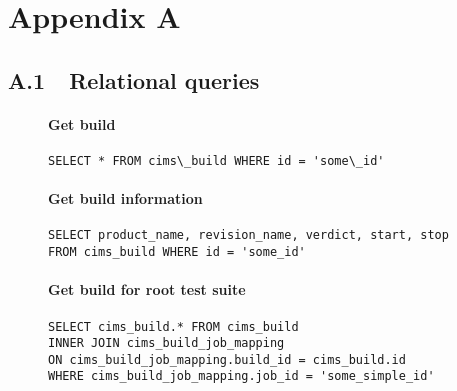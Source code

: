 \appendix
\chapter*{Appendix A}
\label{appendix1}
\section*{A.1\ \ Relational queries}
\label{relationalqueries}

\begin{figure}[H]
\subsubsection*{Get build}
\begin{mdframed}
\label{q:getbuild}
\begin{verbatim}
SELECT * FROM cims\_build WHERE id = 'some\_id'
\end{verbatim}
\label{code:get_build}
\end{mdframed}
\end{figure}

\begin{figure}[H]
\subsubsection*{Get build information}
\begin{mdframed}
\label{q:getbuild}
\begin{verbatim}
SELECT product_name, revision_name, verdict, start, stop
FROM cims_build WHERE id = 'some_id'
\end{verbatim}
\label{code:get_buildinfo}
\end{mdframed}
\end{figure}

\begin{figure}[H]
\subsubsection*{Get build for root test suite}
\label{q:getbuildforroot}
\begin{mdframed}
\begin{verbatim}
SELECT cims_build.* FROM cims_build
INNER JOIN cims_build_job_mapping
ON cims_build_job_mapping.build_id = cims_build.id   
WHERE cims_build_job_mapping.job_id = 'some_simple_id'
\end{verbatim} 
\end{mdframed}
\end{figure}

